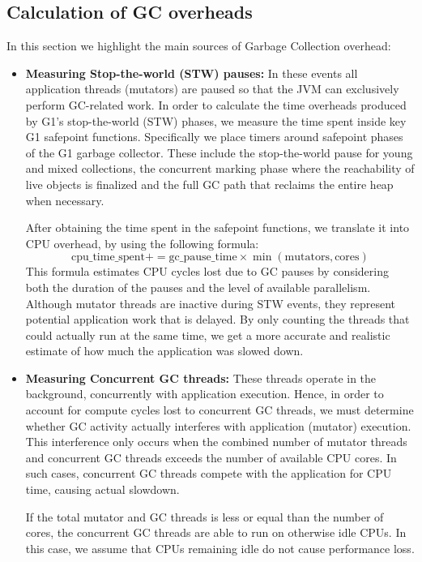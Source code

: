 \subsection{Calculation of GC overheads}

In this section we highlight the main sources of Garbage Collection overhead:

\begin{itemize}
  \item \textbf{Measuring Stop-the-world (STW) pauses:} In these events
  all application threads (mutators) are paused so that the JVM can exclusively perform 
  GC-related work. In order to calculate the time overheads produced by G1’s stop-the-world (STW) phases,
  we measure the time spent inside key G1 safepoint functions. 
  Specifically we place timers around safepoint phases of the G1 garbage collector. 
  These include the stop-the-world pause for young and mixed collections, the concurrent 
  marking phase where the reachability of live objects is finalized and the full GC path
  that reclaims the entire heap when necessary. 

  After obtaining the time spent in the safepoint functions, we translate it into CPU overhead, by using the following formula:
  \[
  \text{cpu\_time\_spent} += \text{gc\_pause\_time} \times \min(\text{mutators}, \text{cores})
  \]
  This formula estimates CPU cycles lost due to GC pauses by considering both the duration of the pauses and the level of available parallelism. 
  Although mutator threads are inactive during STW events, they represent potential application work that is delayed. 
  By only counting the threads that could actually run at the same time, we get a more accurate and realistic estimate of how much the application was slowed down. 

  \item \textbf{Measuring Concurrent GC threads:} These threads operate in the background,
  concurrently with application execution. 
  Hence, in order to account for compute cycles lost to concurrent GC threads, 
  we must determine whether GC activity actually interferes with 
  application (mutator) execution. This interference only occurs when the combined number of 
  mutator threads and concurrent GC threads exceeds the number of available 
  CPU cores. In such cases, concurrent GC threads compete with the application 
  for CPU time, causing actual slowdown.

  If the total mutator and GC threads is less or equal than the number of cores, the concurrent 
  GC threads are able to run on otherwise idle CPUs. In this case, we assume that
  CPUs remaining idle do not cause performance loss.


\end{itemize}
